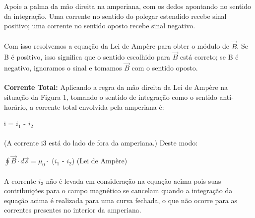 \documentclass[a4paper, 12pt]{article}
\begin{document}
\begin{mdframed}[backgroundcolor=gray!20] 
         Apoie a palma da mão direita na amperiana, com os dedos apontando no sentido da integração. Uma corrente no sentido do polegar estendido recebe sinal positivo; uma corrente no sentido oposto recebe sinal negativo.
    \end{mdframed}
    
\paragraph{}Com isso resolvemos a equação da Lei de Ampère para obter o módulo de $\overrightarrow{B}$. Se B é positivo, isso significa que o sentido escolhido para $\overrightarrow{B}$ está correto; se B é negativo, ignoramos o sinal e tomamos $\overrightarrow{B}$ com o sentido oposto.

\paragraph{}\textbf{Corrente Total:} Aplicando a regra da mão direita da Lei de Ampère na situação da Figura 1, tomando o sentido de integração como o sentido anti-horário, a corrente total envolvida pela amperiana é:

\begin{mdframed}[backgroundcolor=gray!20]
\begin{center}
    i = $i_1$ - $i_2$
    \end{center}
\end{mdframed}
	
\paragraph{}(A corrente i3 está do lado de fora da amperiana.) Deste modo:


	\begin{mdframed}[backgroundcolor=gray!20]
	\begin{center}
		\quad $\oint{\overrightarrow{B}}\cdot d\overrightarrow{s}=\mu _{0}\cdot$ ($i_1$ - $i_2$)  (Lei de Ampère)
		\end{center}
\end{mdframed}

\paragraph{}A corrente $i_3$ não é levada em consideração na equação acima pois suas contribuições para o campo magnético se cancelam quando a integração da equação acima é realizada para uma curva fechada, o que não ocorre para as correntes presentes no interior da amperiana.
\end{document}
